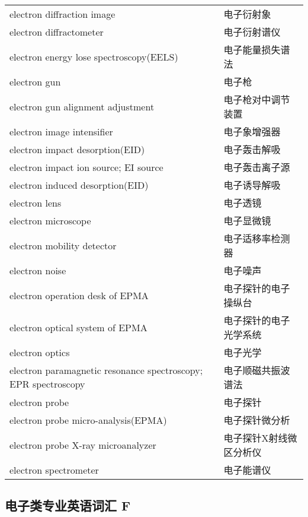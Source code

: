 \documentclass[
]{article}
\begin{document}
\begin{longtable}[]{@{}ll@{}}
electron diffraction image & 电子衍射象 \\
electron diffractometer & 电子衍射谱仪 \\
electron energy lose spectroscopy(EELS) & 电子能量损失谱法 \\
electron gun & 电子枪 \\
electron gun alignment adjustment & 电子枪对中调节装置 \\
electron image intensifier & 电子象增强器 \\
electron impact desorption(EID) & 电子轰击解吸 \\
electron impact ion source; EI source & 电子轰击离子源 \\
electron induced desorption(EID) & 电子诱导解吸 \\
electron lens & 电子透镜 \\
electron microscope & 电子显微镜 \\
electron mobility detector & 电子适移率检测器 \\
electron noise & 电子噪声 \\
electron operation desk of EPMA & 电子探针的电子操纵台 \\
electron optical system of EPMA & 电子探针的电子光学系统 \\
electron optics & 电子光学 \\
electron paramagnetic resonance spectroscopy; EPR spectroscopy &
电子顺磁共振波谱法 \\
electron probe & 电子探针 \\
electron probe micro-analysis(EPMA) & 电子探针微分析 \\
electron probe X-ray microanalyzer & 电子探针X射线微区分析仪 \\
electron spectrometer & 电子能谱仪 \\
\bottomrule()
\end{longtable}

\hypertarget{ux7535ux5b50ux7c7bux4e13ux4e1aux82f1ux8bedux8bcdux6c47-f}{%
\subsection{\texorpdfstring{电子类专业英语词汇 F
}{电子类专业英语词汇 F }}\label{ux7535ux5b50ux7c7bux4e13ux4e1aux82f1ux8bedux8bcdux6c47-f}}
\end{document}
